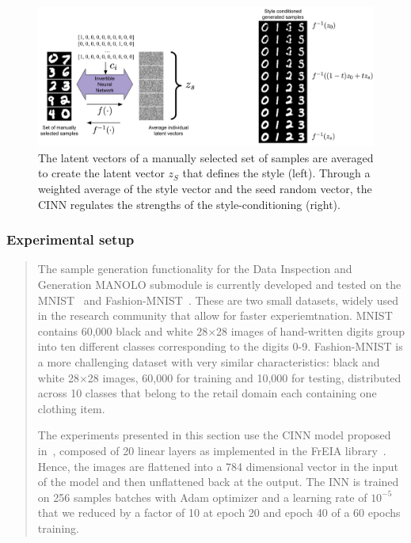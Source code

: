\begin{figure}
    \centering
    \vspace{-2pt}
    \includegraphics[width=1.0\columnwidth]{fig_datasynth/style_conditional_generation.png} 
    \caption[Style-conditioned sample generation]{\label{fig:ciinn_style_conditioning} The latent vectors of a manually selected set of samples are averaged to create the latent vector $z_S$ that defines the style (left). Through a weighted average of the style vector and the seed random vector, the CINN regulates the strengths of the style-conditioning (right).}
\end{figure}




\subsubsection*{Experimental setup} 
\begin{quote}
The sample generation functionality for the Data Inspection and Generation MANOLO submodule is currently developed and tested on the MNIST~\cite{1998_IEEE_MNIST} and Fashion-MNIST~\cite{2017fashionMNIST}. These are two small datasets, widely used in the research community that allow for faster experiemtnation. MNIST contains 60,000 black and white 28$\times$28 images of hand-written digits group into ten different classes corresponding to the digits 0-9. Fashion-MNIST is a more challenging dataset with very similar characteristics: black and white 28$\times$28 images, 60,000 for training and 10,000 for testing, distributed across 10 classes that belong to the retail domain each containing one clothing item.  
    
The experiments presented in this section use the CINN model  proposed in~\cite{2019_arxiv_cinn}, composed of 20 linear layers as implemented in the FrEIA library~\cite{freia}. Hence, the images are flattened into a 784 dimensional vector in the input of the model and then unflattened back at the output. The INN is trained on 256 samples batches with Adam optimizer and a learning rate of $10^{-5}$ that we reduced by a factor of 10 at epoch 20 and epoch 40 of a 60 epochs training.
\end{quote}


